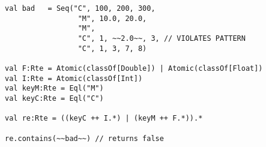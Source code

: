 \begin{lstlisting}[style=scalaioScala]
val bad   = Seq("C", 100, 200, 300,
                 "M", 10.0, 20.0,
                 "M",
                 "C", 1, ~~2.0~~, 3, // VIOLATES PATTERN
                 "C", 1, 3, 7, 8)

val F:Rte = Atomic(classOf[Double]) | Atomic(classOf[Float])
val I:Rte = Atomic(classOf[Int])
val keyM:Rte = Eql("M")
val keyC:Rte = Eql("C")

val re:Rte = ((keyC ++ I.*) | (keyM ++ F.*)).*

re.contains(~~bad~~) // returns false
\end{lstlisting}
